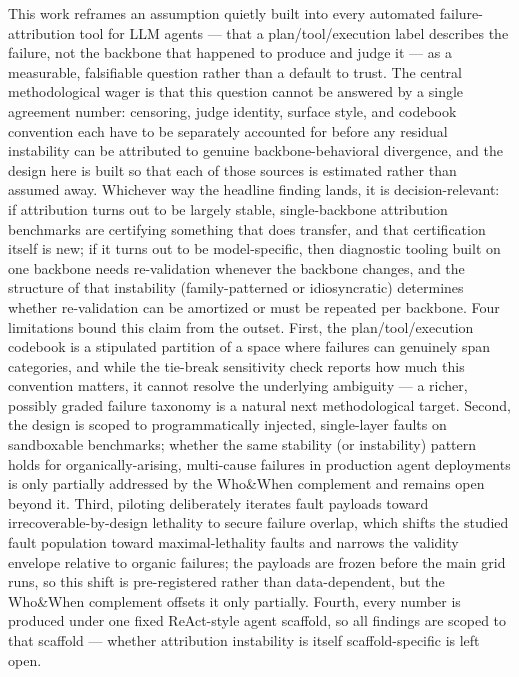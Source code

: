 \documentclass[11pt]{article}
\begin{document}
This work reframes an assumption quietly built into every automated failure-attribution tool for LLM agents --- that a plan/tool/execution label describes the failure, not the backbone that happened to produce and judge it --- as a measurable, falsifiable question rather than a default to trust. The central methodological wager is that this question cannot be answered by a single agreement number: censoring, judge identity, surface style, and codebook convention each have to be separately accounted for before any residual instability can be attributed to genuine backbone-behavioral divergence, and the design here is built so that each of those sources is estimated rather than assumed away. Whichever way the headline finding lands, it is decision-relevant: if attribution turns out to be largely stable, single-backbone attribution benchmarks are certifying something that does transfer, and that certification itself is new; if it turns out to be model-specific, then diagnostic tooling built on one backbone needs re-validation whenever the backbone changes, and the structure of that instability (family-patterned or idiosyncratic) determines whether re-validation can be amortized or must be repeated per backbone. Four limitations bound this claim from the outset. First, the plan/tool/execution codebook is a stipulated partition of a space where failures can genuinely span categories, and while the tie-break sensitivity check reports how much this convention matters, it cannot resolve the underlying ambiguity --- a richer, possibly graded failure taxonomy is a natural next methodological target. Second, the design is scoped to programmatically injected, single-layer faults on sandboxable benchmarks; whether the same stability (or instability) pattern holds for organically-arising, multi-cause failures in production agent deployments is only partially addressed by the Who\&When complement and remains open beyond it. Third, piloting deliberately iterates fault payloads toward irrecoverable-by-design lethality to secure failure overlap, which shifts the studied fault population toward maximal-lethality faults and narrows the validity envelope relative to organic failures; the payloads are frozen before the main grid runs, so this shift is pre-registered rather than data-dependent, but the Who\&When complement offsets it only partially. Fourth, every number is produced under one fixed ReAct-style agent scaffold, so all findings are scoped to that scaffold --- whether attribution instability is itself scaffold-specific is left open.
\end{document}
